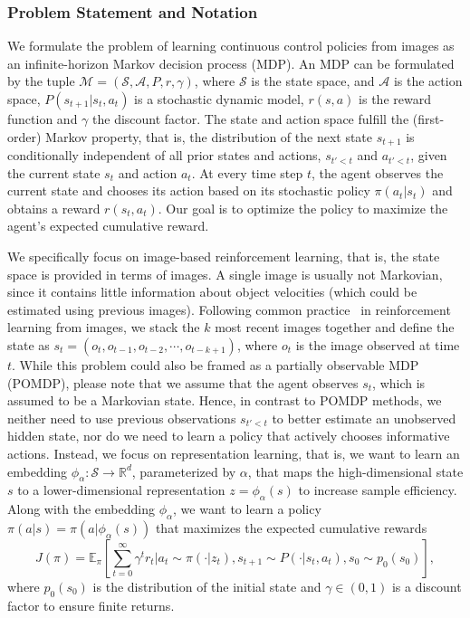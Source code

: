 \documentclass[a4paper,12pt]{article}
\begin{document}
\subsubsection{Problem Statement and Notation}
We formulate the problem of learning continuous control policies from images as an infinite-horizon Markov decision process (MDP). An MDP can be formulated by the tuple $\mathcal{M} =(\mathcal{S},\mathcal{A},P,r,\gamma)$, where $\mathcal{S}$ is the state space, and $\mathcal{A}$ is the action space, $P(s_{t+1}|s_t,a_t)$ is a stochastic dynamic model, $r(s,a)$ is the reward function and $\gamma$ the discount factor. The state and action space fulfill the (first-order) Markov property, that is, the distribution of the next state $s_{t+1}$ is conditionally independent of all prior states and actions, $s_{t'<t}$ and $a_{t'<t}$, given the current state $s_t$ and action $a_t$. At every time step $t$, the agent observes the current state and chooses its action based on its stochastic policy $\pi(a_t|s_t)$ and obtains a reward $r(s_t, a_t)$. Our goal is to optimize the policy to maximize the agent's expected cumulative reward. 

We specifically focus on image-based reinforcement learning, that is, the state space is provided in terms of images. A single image is usually not Markovian, since it contains little information about object velocities (which could be estimated using previous images). Following common practice~\cite{mnih2013playing} in reinforcement learning from images, we stack the $k$ most recent images together and define the state as $s_t = (o_t, o_{t-1}, o_{t-2}, \cdots, o_{t-k+1})$, where $o_t$ is the image observed at time $t$. While this problem could also be framed as a partially observable MDP (POMDP), please note that we assume that the agent observes $s_t$, which is assumed to be a Markovian state. Hence, in contrast to POMDP methods, we neither need to use previous observations $s_{t'<t}$ to better estimate an unobserved hidden state, nor do we need to learn a policy that actively chooses informative actions. Instead, we focus on representation learning, that is, we want to learn an embedding $\phi_\alpha : \mathcal{S} \rightarrow \mathbb{R}^d$, parameterized by $\alpha$, that maps the high-dimensional state $s$ to a lower-dimensional representation $z = \phi_\alpha(s)$ to increase sample efficiency. Along with the embedding $\phi_\alpha$, we want to learn a policy $\pi(a|s) = \pi(a|\phi_\alpha(s))$ that maximizes the expected cumulative rewards 
\begin{equation}
    J(\pi) = \mathbb{E}_{\pi} \left [ \sum_{t=0}^\infty \gamma ^ t r_t \bigg | a_t \sim \pi(\cdot | z_t), s_{t+1} \sim P(\cdot | s_t, a_t), s_0 \sim p_0(s_0)\right], 
\end{equation}
where $p_0(s_0)$ is the distribution of the initial state and $\gamma \in (0,1)$ is a discount factor to ensure finite returns.
\end{document}
